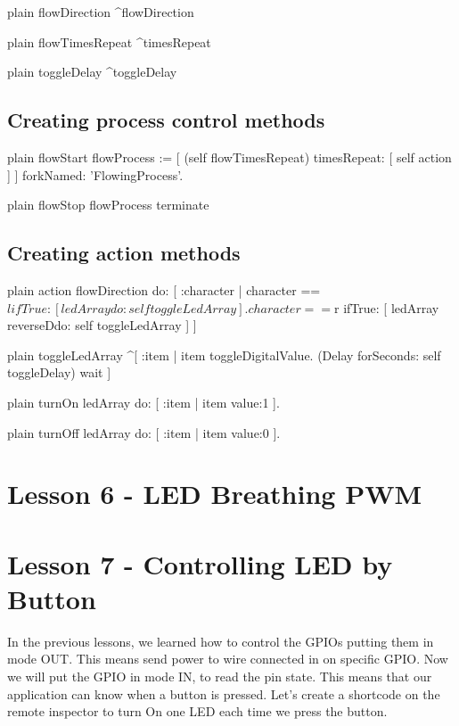 \documentclass[10pt,twoside,english]{_support/latex/sbabook/sbabook}
\begin{document}
\begin{displaycode}{plain}
flowDirection
    ^flowDirection
\end{displaycode}

\begin{displaycode}{plain}
flowTimesRepeat
    ^timesRepeat
\end{displaycode}

\begin{displaycode}{plain}
toggleDelay
     ^toggleDelay
\end{displaycode}
\section{Creating process control methods}
\begin{displaycode}{plain}
flowStart
    flowProcess := [ (self flowTimesRepeat) timesRepeat: [
          self action
      ] ] forkNamed: 'FlowingProcess'.
\end{displaycode}

\begin{displaycode}{plain}
flowStop
    flowProcess terminate
\end{displaycode}
\section{Creating action methods}
\begin{displaycode}{plain}
action  
flowDirection do: [ :character | character == $l ifTrue: [ ledArray do: self toggleLedArray  ]. 
                        character == $r ifTrue: [ ledArray reverseDdo: self toggleLedArray  ] ] 
\end{displaycode}

\begin{displaycode}{plain}
toggleLedArray
    ^[ :item | item toggleDigitalValue. (Delay forSeconds: self toggleDelay) wait ]
\end{displaycode}

\begin{displaycode}{plain}
turnOn
    ledArray do: [ :item | item value:1 ].
\end{displaycode}

\begin{displaycode}{plain}
turnOff
    ledArray do: [ :item | item value:0 ].
\end{displaycode}
\chapter{Lesson 6 - LED Breathing PWM}\chapter{Lesson 7 - Controlling LED by Button}
In the previous lessons, we learned how to control the GPIOs putting them in mode OUT. This means send power to wire connected in on specific GPIO. Now we will put the GPIO in mode IN, to read the pin state. This means that our application can know when a button is pressed. Let’s create a shortcode on the remote inspector to turn On one LED each time we press the button.
\end{document}
